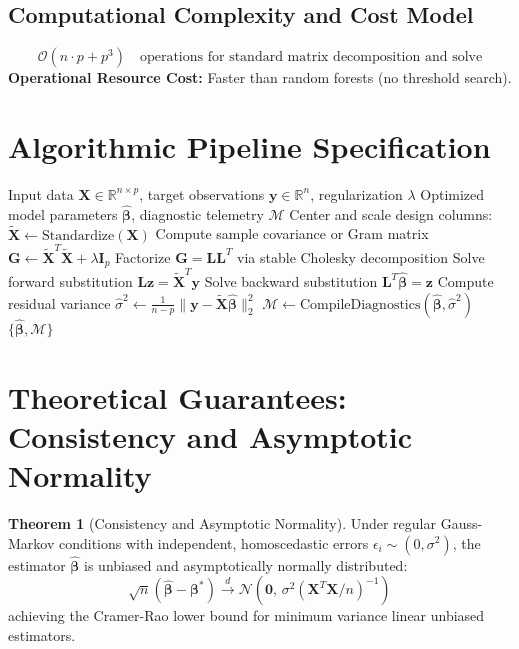 \documentclass[11pt,a4paper]{article}
\theoremstyle{definition}
\newtheorem{theorem}{\textbf{Theorem}}[section]
\begin{document}
\subsection{Computational Complexity and Cost Model}
\begin{equation}
\mathcal{O}(n \cdot p + p^3) \quad \text{operations for standard matrix decomposition and solve}
\end{equation}
\textbf{Operational Resource Cost:} Faster than random forests (no threshold search).

\section{Algorithmic Pipeline Specification}

\begin{algorithm}[H]
\caption{Extremely randomized trees Execution}
\begin{algorithmic}[1]
\Require Input data $\mathbf{X} \in \mathbb{R}^{n \times p}$, target observations $\mathbf{y} \in \mathbb{R}^n$, regularization $\lambda$
\Ensure Optimized model parameters $\hat{\boldsymbol{\beta}}$, diagnostic telemetry $\mathcal{M}$
\State Center and scale design columns: $\tilde{\mathbf{X}} \gets \text{Standardize}(\mathbf{X})$
\State Compute sample covariance or Gram matrix $\mathbf{G} \gets \tilde{\mathbf{X}}^T \tilde{\mathbf{X}} + \lambda \mathbf{I}_p$
\State Factorize $\mathbf{G} = \mathbf{L} \mathbf{L}^T$ via stable Cholesky decomposition
\State Solve forward substitution $\mathbf{L} \mathbf{z} = \tilde{\mathbf{X}}^T \mathbf{y}$
\State Solve backward substitution $\mathbf{L}^T \hat{\boldsymbol{\beta}} = \mathbf{z}$
\State Compute residual variance $\hat{\sigma}^2 \gets \frac{1}{n - p} \| \mathbf{y} - \tilde{\mathbf{X}} \hat{\boldsymbol{\beta}} \|_2^2$
\State $\mathcal{M} \gets \text{CompileDiagnostics}(\hat{\boldsymbol{\beta}}, \hat{\sigma}^2)$
\State \Return $\{\hat{\boldsymbol{\beta}}, \mathcal{M}\}$
\end{algorithmic}
\end{algorithm}

\section{Theoretical Guarantees: Consistency and Asymptotic Normality}

\begin{theorem}[Consistency and Asymptotic Normality]
Under regular Gauss-Markov conditions with independent, homoscedastic errors $\epsilon_i \sim (0, \sigma^2)$, the estimator $\hat{\boldsymbol{\beta}}$ is unbiased and asymptotically normally distributed:
\begin{equation}
\sqrt{n}(\hat{\boldsymbol{\beta}} - \boldsymbol{\beta}^*) \xrightarrow{d} \mathcal{N}\left(\mathbf{0}, \, \sigma^2 (\mathbf{X}^T \mathbf{X} / n)^{-1}\right)
\end{equation}
achieving the Cramer-Rao lower bound for minimum variance linear unbiased estimators.
\end{theorem}
\end{document}
